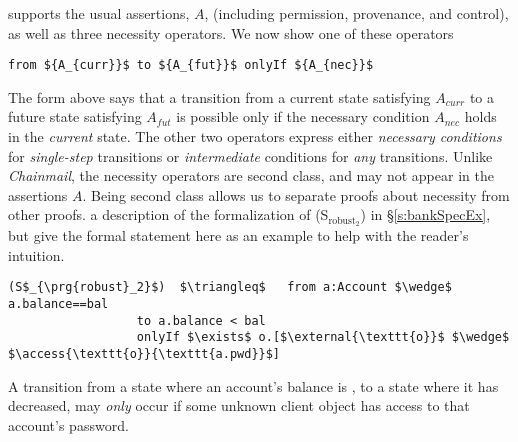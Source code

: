 {%
\Nec supports the usual assertions, $A$, (including permission, provenance,
and control), as well as three necessity 
{operators. We now show one of these operators} 
\begin{lstlisting}[mathescape=true, language=chainmail, frame=lines]
                                from ${A_{curr}}$ to ${A_{fut}}$ onlyIf ${A_{nec}}$ 
\end{lstlisting}
The  form   {above} says that %
a  {transition} from a current state satisfying $A_{curr}$ to a future
state satisfying $A_{fut}$ %
is possible only if the necessary condition
$A_{nec}$ holds in the \emph{current} state.
 {The other two operators express either \emph{necessary conditions} for
\emph{single-step} transitions %
or \emph{intermediate} conditions for \emph{any} transitions.
}
Unlike  \emph{Chainmail}, 
 the necessity operators %
 are second class, and may not appear in the assertions $A$.
Being second class allows us to separate proofs about necessity from other proofs.
 a description of the formalization of (S$_{\text{robust}_2}$) %
in  \S\ref{s:bankSpecEx}, but give the formal statement here as an example to help with 
the reader's intuition. 
\begin{lstlisting}[language = Chainmail, mathescape=true, frame=lines]
(S$_{\prg{robust}_2}$)  $\triangleq$   from a:Account $\wedge$ a.balance==bal
                  to a.balance < bal
                  onlyIf $\exists$ o.[$\external{\texttt{o}}$ $\wedge$ $\access{\texttt{o}}{\texttt{a.pwd}}$]
\end{lstlisting}
A transition from a  state where an account's balance is , to a  state where 
it has decreased, may \emph{only} occur if  some unknown client object  has access to that account's password. 


}
